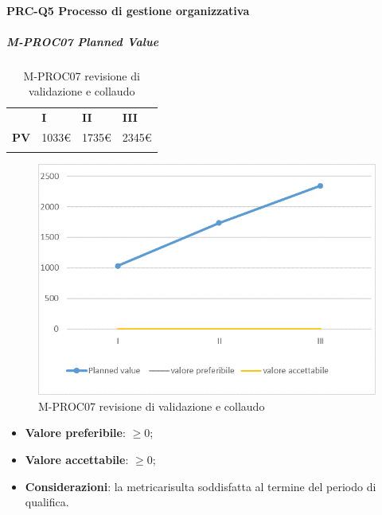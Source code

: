\paragraph*{PRC-Q5 Processo di gestione organizzativa}
\subparagraph{M-PROC07 Planned Value} \mbox{}
\begin{longtable}[H!] {						
		>{}p{35mm}  		
		>{}p{12mm}
		>{}p{12mm}		
		>{}p{12mm}		
	}
	\rowcolor{gray!50}
	\textbf{} & \textbf{I} & \textbf{II} & \textbf{III} \TBstrut \\ [2mm]
	\textbf{PV} & 1033\euro & 1735\euro & 2345\euro  \TBstrut \\ [2mm]
	\rowcolor{white}
	\caption{M-PROC07 revisione di validazione e collaudo}
\end{longtable}
\begin{figure}[H] 	
	\includegraphics[width=\linewidth]{./img/grafici/RA7.png}	
	\caption{M-PROC07 revisione di validazione e collaudo}	
\end{figure}
\begin{itemize}
	\item \textbf{Valore preferibile}: $\ge0$;
	\item \textbf{Valore accettabile}: $\ge0$;
	\item \textbf{Considerazioni}: la metrica\glosp risulta soddisfatta al termine del periodo di qualifica.
\end{itemize}


